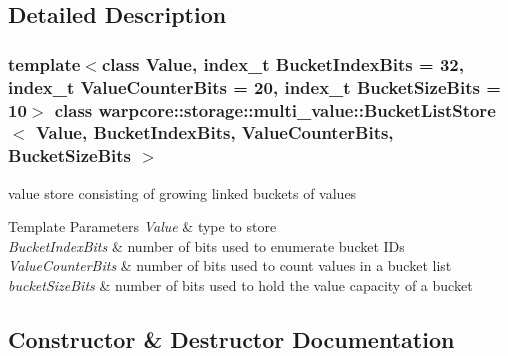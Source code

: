 \subsection{Detailed Description}
\subsubsection*{template$<$class Value, index\+\_\+t Bucket\+Index\+Bits = 32, index\+\_\+t Value\+Counter\+Bits = 20, index\+\_\+t Bucket\+Size\+Bits = 10$>$\newline
class warpcore\+::storage\+::multi\+\_\+value\+::\+Bucket\+List\+Store$<$ Value, Bucket\+Index\+Bits, Value\+Counter\+Bits, Bucket\+Size\+Bits $>$}

value store consisting of growing linked buckets of values 


\begin{DoxyTemplParams}{Template Parameters}
{\em Value} & type to store \\
\hline
{\em Bucket\+Index\+Bits} & number of bits used to enumerate bucket I\+Ds \\
\hline
{\em Value\+Counter\+Bits} & number of bits used to count values in a bucket list \\
\hline
{\em bucket\+Size\+Bits} & number of bits used to hold the value capacity of a bucket \\
\hline
\end{DoxyTemplParams}


\subsection{Constructor \& Destructor Documentation}
\mbox{\label{classwarpcore_1_1storage_1_1multi__value_1_1BucketListStore_a9dd3b0501fb07b36747b6a68b7ce49ba}} 
